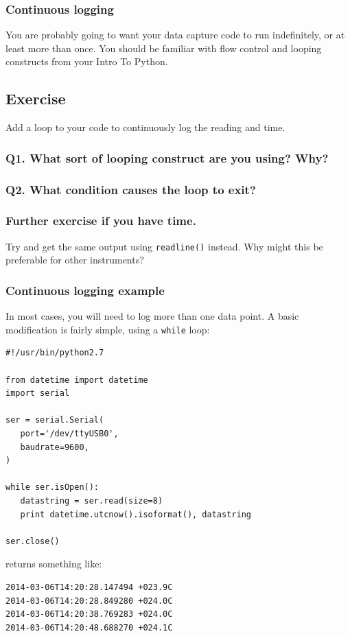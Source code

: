 \documentclass[aspectratio=1610,9pt]{beamer} %
\begin{document}
\begin{frame}
\frametitle{Continuous logging}

You are probably going to want your data capture code to run
indefinitely, or at least more than once. You should be familiar with
flow control and looping constructs from your Intro To Python.

\subsection{Exercise}

Add a loop to your code to continuously log the reading and time.

\subsubsection{Q1. What sort of looping construct are you using?
Why?}

\subsubsection{Q2. What condition causes the loop to
exit?}

\subsubsection{Further exercise if you have
time.}

Try and get the same output using \texttt{readline()} instead. Why might
this be preferable for other instruments?

\end{frame}
\begin{frame}[fragile]
\frametitle{Continuous logging
example}

In most cases, you will need to log more than one data point. A basic
modification is fairly simple, using a \texttt{while} loop:

\begin{verbatim}
#!/usr/bin/python2.7

from datetime import datetime
import serial

ser = serial.Serial(
   port='/dev/ttyUSB0',
   baudrate=9600,
)

while ser.isOpen():
   datastring = ser.read(size=8)
   print datetime.utcnow().isoformat(), datastring

ser.close()
\end{verbatim}

returns something like:

\begin{verbatim}
2014-03-06T14:20:28.147494 +023.9C
2014-03-06T14:20:28.849280 +024.0C
2014-03-06T14:20:38.769283 +024.0C
2014-03-06T14:20:48.688270 +024.1C
\end{verbatim}

\end{frame}
\end{document}
